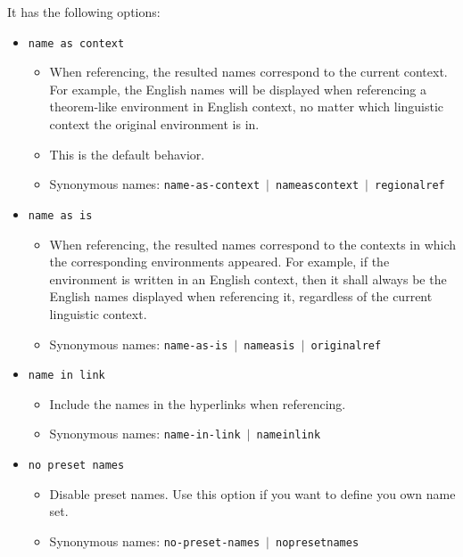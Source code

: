 \documentclass[classical]{einfart}
\newcommand{\packageoption}[1]{\texttt{\textcolor{code-option}{#1}}}
\begin{document}
\medskip
It has the following options:
\begin{itemize}[label=,leftmargin=1.25em,itemindent=-1.25em]
    \item \packageoption{name as context}
        \begin{itemize}
            \item When referencing, the resulted names correspond to the current context. For example, the English names will be displayed when referencing a theorem-like environment in English context, no matter which linguistic context the original environment is in.
            \item This is the default behavior.
            \item Synonymous names: \packageoption{name-as-context} \,$|$\, \packageoption{nameascontext} \,$|$\, \packageoption{regionalref}
        \end{itemize}
    \item \packageoption{name as is}
        \begin{itemize}
            \item When referencing, the resulted names correspond to the contexts in which the corresponding environments appeared. For example, if the environment is written in an English context, then it shall always be the English names displayed when referencing it, regardless of the current linguistic context.
            \item Synonymous names: \packageoption{name-as-is} \,$|$\, \packageoption{nameasis} \,$|$\, \packageoption{originalref}
        \end{itemize}
    \item \packageoption{name in link}
        \begin{itemize}
            \item Include the names in the hyperlinks when referencing.
            \item Synonymous names: \packageoption{name-in-link} \,$|$\, \packageoption{nameinlink}
        \end{itemize}
    \item \packageoption{no preset names}
        \begin{itemize}
            \item Disable preset names. Use this option if you want to define you own name set.
            \item Synonymous names: \packageoption{no-preset-names} \,$|$\, \packageoption{nopresetnames}
        \end{itemize}
\end{itemize}
\end{document}
